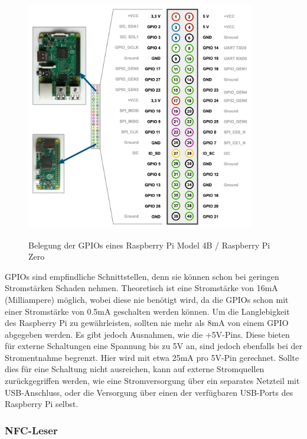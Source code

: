 \begin{figure}
  \centering
  \includegraphics[width=10cm]{pics/GPIO.png}
  \caption{Belegung der GPIOs eines Raspberry Pi Model 4B / Raspberry Pi Zero}
  \cite{GPIOLayout}
\end{figure}
GPIOs sind empfindliche Schnittstellen, denn sie können schon bei geringen Stromstärken Schaden nehmen. Theoretisch ist eine Stromstärke von 16mA (Milliampere) möglich, wobei diese nie benötigt wird, da die GPIOs schon mit einer Stromstärke von 0.5mA geschalten werden können. Um die Langlebigkeit des Raspberry Pi zu gewährleisten, sollten nie mehr als 8mA von einem GPIO abgegeben werden. 
Es gibt jedoch Ausnahmen, wie die +5V-Pins. Diese bieten für externe Schaltungen eine Spannung bis zu 5V an, sind jedoch ebenfalls bei der Stromentnahme begrenzt. Hier wird mit etwa 25mA pro 5V-Pin gerechnet. Sollte dies für eine Schaltung nicht ausreichen, kann auf externe Stromquellen zurückgegriffen werden, wie eine Stromversorgung über ein separates Netzteil mit USB-Anschluss, oder die Versorgung über einen der verfügbaren USB-Ports des Raspberry Pi selbst. 

\cite{GPIO}
\subsubsection{NFC-Leser}
